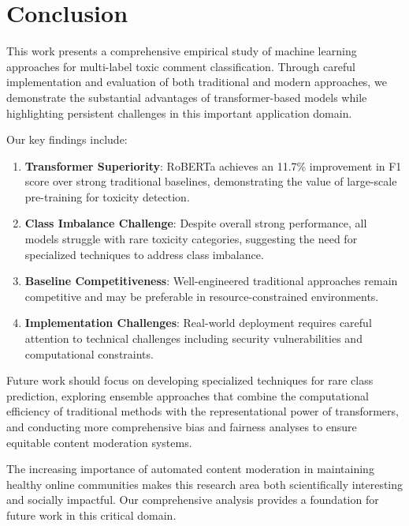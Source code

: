 \documentclass[11pt]{article}
\begin{document}
\section{Conclusion}

This work presents a comprehensive empirical study of machine learning approaches for multi-label toxic comment classification. Through careful implementation and evaluation of both traditional and modern approaches, we demonstrate the substantial advantages of transformer-based models while highlighting persistent challenges in this important application domain.

Our key findings include:

\begin{enumerate}
    \item \textbf{Transformer Superiority}: RoBERTa achieves an 11.7\% improvement in F1 score over strong traditional baselines, demonstrating the value of large-scale pre-training for toxicity detection.
    
    \item \textbf{Class Imbalance Challenge}: Despite overall strong performance, all models struggle with rare toxicity categories, suggesting the need for specialized techniques to address class imbalance.
    
    \item \textbf{Baseline Competitiveness}: Well-engineered traditional approaches remain competitive and may be preferable in resource-constrained environments.
    
    \item \textbf{Implementation Challenges}: Real-world deployment requires careful attention to technical challenges including security vulnerabilities and computational constraints.
\end{enumerate}

Future work should focus on developing specialized techniques for rare class prediction, exploring ensemble approaches that combine the computational efficiency of traditional methods with the representational power of transformers, and conducting more comprehensive bias and fairness analyses to ensure equitable content moderation systems.

The increasing importance of automated content moderation in maintaining healthy online communities makes this research area both scientifically interesting and socially impactful. Our comprehensive analysis provides a foundation for future work in this critical domain.
\end{document}
